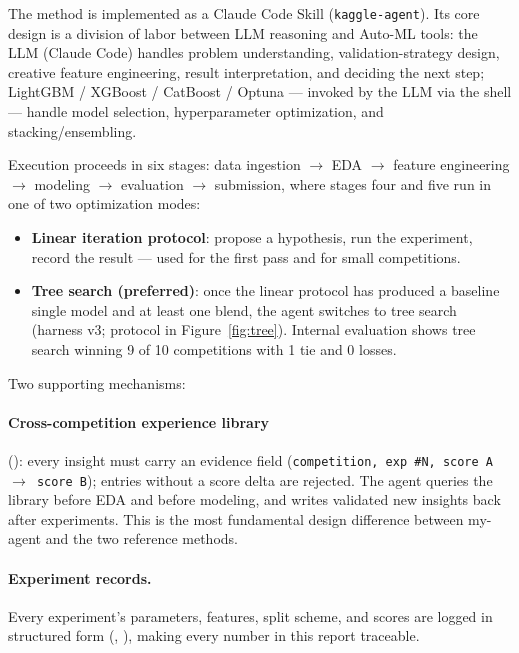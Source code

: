 \documentclass[11pt,a4paper]{article}
\begin{document}
The method is implemented as a Claude Code Skill (\texttt{kaggle-agent}). Its core design is a division of labor between LLM reasoning and Auto-ML tools: the LLM (Claude Code) handles problem understanding, validation-strategy design, creative feature engineering, result interpretation, and deciding the next step; LightGBM / XGBoost / CatBoost / Optuna --- invoked by the LLM via the shell --- handle model selection, hyperparameter optimization, and stacking/ensembling.

Execution proceeds in six stages: data ingestion $\to$ EDA $\to$ feature engineering $\to$ modeling $\to$ evaluation $\to$ submission, where stages four and five run in one of two optimization modes:

\begin{itemize}[leftmargin=*]
  \item \textbf{Linear iteration protocol}: propose a hypothesis, run the experiment, record the result --- used for the first pass and for small competitions.
  \item \textbf{Tree search (preferred)}: once the linear protocol has produced a baseline single model and at least one blend, the agent switches to tree search (harness v3; protocol in Figure~\ref{fig:tree}). Internal evaluation shows tree search winning 9 of 10 competitions with 1 tie and 0 losses.
\end{itemize}

Two supporting mechanisms:

\paragraph{Cross-competition experience library} (): every insight must carry an evidence field (\texttt{competition, exp \#N, score A $\to$ score B}); entries without a score delta are rejected. The agent queries the library before EDA and before modeling, and writes validated new insights back after experiments. This is the most fundamental design difference between my-agent and the two reference methods.

\paragraph{Experiment records.} Every experiment's parameters, features, split scheme, and scores are logged in structured form (, ), making every number in this report traceable.
\end{document}
